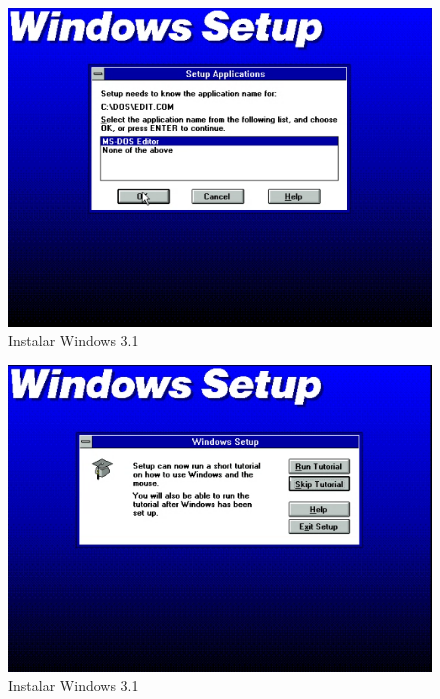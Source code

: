 \documentclass{report}
\begin{document}
\begin{figure}
\centering
\includegraphics[width=\textwidth]{Screenshot_34.png}
\caption{Instalar Windows 3.1}
\label{fig:34}
\end{figure}

\begin{figure}
\centering
\includegraphics[width=\textwidth]{Screenshot_35.png}
\caption{Instalar Windows 3.1}
\label{fig:35}
\end{figure}
\end{document}
